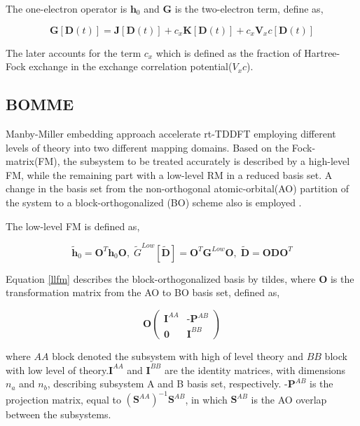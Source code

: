 \documentclass[notitlepage,12pt]{report}
\begin{document}
 	The one-electron operator is $\textbf{h}_0$ and $\textbf{G}$ is the two-electron term,  define as,
 	
 	\begin{equation}
 		\textbf{G}[\textbf{D}(t)] = \textbf{J}[\textbf{D}(t)]+c_x\textbf{K}[\textbf{D}(t)]+c_x\textbf{V}_xc[\textbf{D}(t)]
 	\end{equation}
 	
 	The later accounts for the term $c_x$ which is defined as the fraction of Hartree-Fock exchange in the exchange correlation potential($V_xc$).

\subsection{BOMME}
	Manby-Miller embedding approach accelerate rt-TDDFT employing different levels of theory into two different mapping domains. Based on the Fock-matrix(FM), the subsystem to be treated accurately is described by a high-level FM, while the remaining part with a low-level RM in a reduced basis set. A change in the basis set from the non-orthogonal atomic-orbital(AO) partition of the system to a block-orthogonalized (BO) scheme also is employed \supercite{ding2017embedded}. 
	
	The low-level FM is defined as,
	
	\begin{equation}
		\label{llfm}
		\tilde{\textbf{h}}_0 = \textbf{O}^{T}\textbf{h}_0\textbf{O}, \;  \tilde{G}^{Low}[\tilde{\textbf{D}}]= \textbf{O}^{T}\textbf{G}^{Low}\textbf{O}, \;  \tilde{\textbf{D}} = \textbf{O} \textbf{D} \textbf{O}^{T}
	\end{equation} 
	
	Equation \ref{llfm} describes the block-orthogonalized basis by tildes, where $\textbf{O}$ is the transformation matrix from the AO to BO basis set, defined as,
	
	\begin{equation}
		\textbf{O}
		\begin{pmatrix}
			\textbf{I}^{AA} & \textbf{-P}^{AB} \\
			\textbf{0} & \textbf{I}^{BB}  
		\end{pmatrix}
	\end{equation}
	
	where $AA$ block denoted the subsystem with high of level theory and $BB$ block with low level of theory.$\textbf{I}^{AA}$ and $\textbf{I}^{BB}$ are the identity matrices, with dimensions $n_a$ and $n_b$, describing subsystem A and B basis set, respectively.  $\textbf{-P}^{AB}$ is the projection matrix, equal to $(\textbf{S}^{AA})^{-1}\textbf{S}^{AB}$, in which $\textbf{S}^{AB}$ is the AO overlap between the subsystems. 
	
\end{document}
